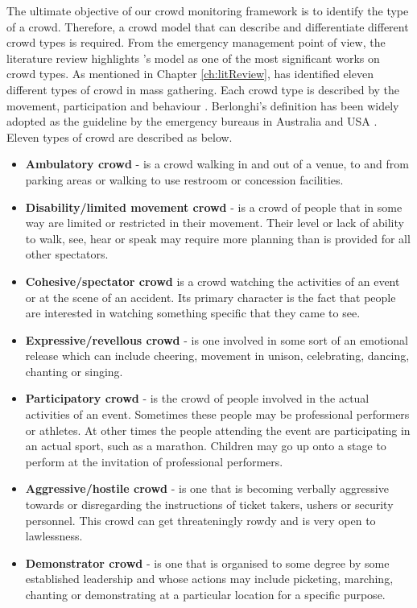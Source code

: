 The ultimate objective of our crowd monitoring framework is to identify the type of a crowd. Therefore, a crowd model that can describe and differentiate different crowd types is required. From the emergency management point of view, the literature review highlights \citet{Berlonghi1995}'s model as one of the most significant works on crowd types. As mentioned in Chapter \ref{ch:litReview}, \citet{Berlonghi1995} has identified eleven different types of crowd in mass gathering. Each crowd type is described by the movement, participation and behaviour \citep{Zeitz2009}. Berlonghi's definition has been widely adopted as the guideline by the emergency bureaus in Australia \citep{EMA1999} and USA \citep{FEMA2005}. Eleven types of crowd are described as below.
\begin{itemize}
\item \textbf{Ambulatory crowd} - is a crowd walking in and out of a venue, to and from parking areas or walking to use restroom or concession facilities.
\item \textbf{Disability/limited movement crowd} - is a crowd of people that in some way are limited or restricted in their movement. Their level or lack of ability to walk, see, hear or speak may require more planning than is provided for all other spectators.
\item \textbf{Cohesive/spectator crowd} is a crowd watching the activities of an event or at the scene of an accident. Its primary character is the fact that people are interested in watching something specific that they came to see.
\item \textbf{Expressive/revellous crowd} - is one involved in some sort of an emotional release which can include cheering, movement in unison, celebrating, dancing, chanting or singing.
\item \textbf{Participatory crowd} - is the crowd of people involved in the actual activities of an event. Sometimes these people may be professional performers or athletes. At other times the people attending the event are participating in an actual sport, such as a marathon. Children may go up onto a stage to perform at the invitation of professional performers.
\item \textbf{Aggressive/hostile crowd} - is one that is becoming verbally aggressive towards or disregarding the instructions of ticket takers, ushers or security personnel. This crowd can get threateningly rowdy and is very open to lawlessness.
\item \textbf{Demonstrator crowd} - is one that is organised to some degree by some established leadership and whose actions may include picketing, marching, chanting or demonstrating at a particular location for a specific purpose.

\end{itemize}
